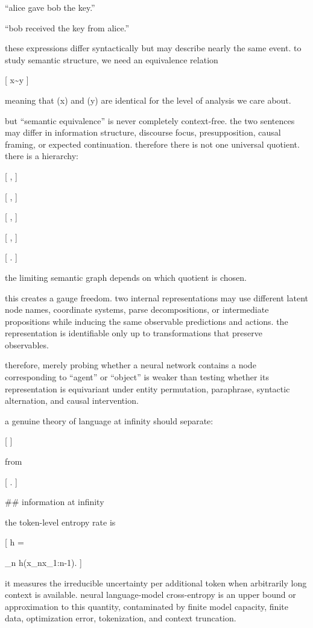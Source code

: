 “alice gave bob the key.”

“bob received the key from alice.”

these expressions differ syntactically but may describe nearly the same event. to study semantic structure, we need an equivalence relation

[
x\sim y
]

meaning that (x) and (y) are identical for the level of analysis we care about.

but “semantic equivalence” is never completely context-free. the two sentences may differ in information structure, discourse focus, presupposition, causal framing, or expected continuation. therefore there is not one universal quotient. there is a hierarchy:

[
,
]

[
,
]

[
,
]

[
,
]

[
.
]

the limiting semantic graph depends on which quotient is chosen.

this creates a gauge freedom. two internal representations may use different latent node names, coordinate systems, parse decompositions, or intermediate propositions while inducing the same observable predictions and actions. the representation is identifiable only up to transformations that preserve observables.

therefore, merely probing whether a neural network contains a node corresponding to “agent” or “object” is weaker than testing whether its representation is equivariant under entity permutation, paraphrase, syntactic alternation, and causal intervention.

a genuine theory of language at infinity should separate:

[
]

from

[
.
]

## information at infinity

the token-level entropy rate is

[
h
=

\lim_{n\to\infty}
h(x_n\mid x_{1:n-1}).
]

it measures the irreducible uncertainty per additional token when arbitrarily long context is available. neural language-model cross-entropy is an upper bound or approximation to this quantity, contaminated by finite model capacity, finite data, optimization error, tokenization, and context truncation.

